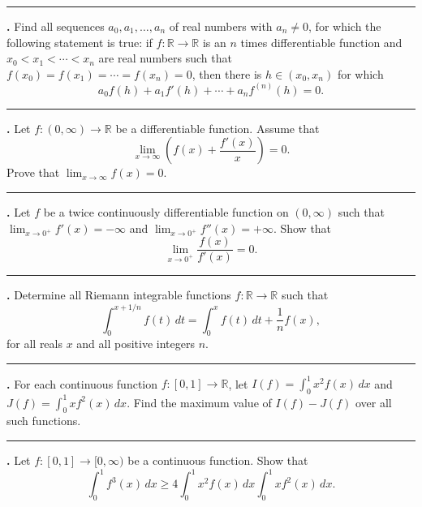 \documentclass[11pt]{article}
\newcounter{probnum}
\newenvironment{problembox}{\par\noindent\rule{\linewidth}{0.5pt}\vspace{5pt}\par}{\vspace{2pt}}
\begin{document}
\begin{problembox}
\textbf{\theprobnum.} Find all sequences $a_0, a_1, \ldots, a_n$ of real numbers with $a_n \ne 0$, for which the following statement is true: if $f : \mathbb{R} \to \mathbb{R}$ is an $n$ times differentiable function and $x_0 < x_1 < \cdots < x_n$ are real numbers such that $f(x_0) = f(x_1) = \cdots = f(x_n) = 0$, then there is $h \in (x_0,x_n)$ for which
\[
a_0 f(h) + a_1 f'(h) + \cdots + a_n f^{(n)}(h) = 0.
\]
\end{problembox}

\begin{problembox}
\textbf{\theprobnum.} Let $f : (0,\infty) \to \mathbb{R}$ be a differentiable function. Assume that
\[
\lim_{x \to \infty} \left(f(x) + \frac{f'(x)}{x}\right) = 0.
\]
Prove that $\displaystyle\lim_{x \to \infty} f(x) = 0$.
\end{problembox}

\begin{problembox}
\textbf{\theprobnum.} Let $f$ be a twice continuously differentiable function on $(0,\infty)$ such that $\displaystyle\lim_{x \to 0^+} f'(x) = -\infty$ and $\displaystyle\lim_{x \to 0^+} f''(x) = +\infty$. Show that
\[
\lim_{x \to 0^+} \frac{f(x)}{f'(x)} = 0.
\]
\end{problembox}

\begin{problembox}
\textbf{\theprobnum.} Determine all Riemann integrable functions $f : \mathbb{R} \to \mathbb{R}$ such that
\[
\int_0^{x+1/n} f(t)\,dt = \int_0^x f(t)\,dt + \frac{1}{n} f(x),
\]
for all reals $x$ and all positive integers $n$.
\end{problembox}

\begin{problembox}
\textbf{\theprobnum.} For each continuous function $f : [0,1] \to \mathbb{R}$, let $I(f) = \displaystyle\int_0^1 x^2 f(x)\,dx$ and $J(f) = \displaystyle\int_0^1 x f^2(x)\,dx$. Find the maximum value of $I(f) - J(f)$ over all such functions.
\end{problembox}

\begin{problembox}
\textbf{\theprobnum.} Let $f : [0,1] \to [0,\infty)$ be a continuous function. Show that
\[
\int_0^1 f^3(x)\,dx \ge 4 \int_0^1 x^2 f(x)\,dx \int_0^1 x f^2(x)\,dx.
\]
\end{problembox}
\end{document}
